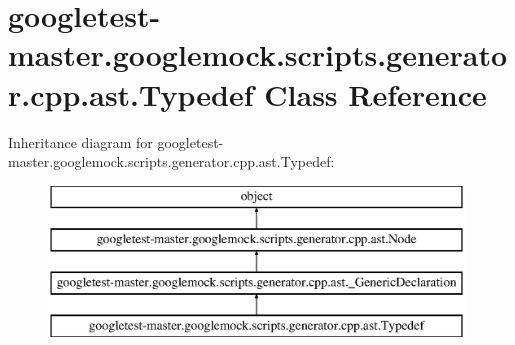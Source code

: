 \hypertarget{classgoogletest-master_1_1googlemock_1_1scripts_1_1generator_1_1cpp_1_1ast_1_1_typedef}{}\section{googletest-\/master.googlemock.\+scripts.\+generator.\+cpp.\+ast.\+Typedef Class Reference}
\label{classgoogletest-master_1_1googlemock_1_1scripts_1_1generator_1_1cpp_1_1ast_1_1_typedef}
Inheritance diagram for googletest-\/master.googlemock.\+scripts.\+generator.\+cpp.\+ast.\+Typedef\+:\begin{figure}[H]
\begin{center}
\leavevmode
\includegraphics[height=4.000000cm]{d4/d38/classgoogletest-master_1_1googlemock_1_1scripts_1_1generator_1_1cpp_1_1ast_1_1_typedef}
\end{center}
\end{figure}
